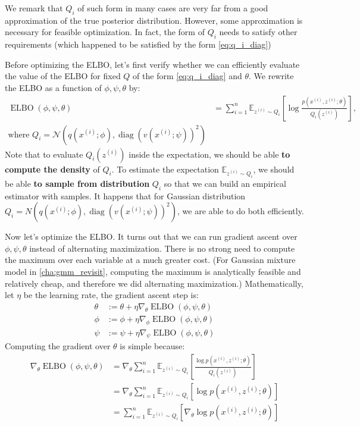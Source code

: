 We remark that $Q_i$ of such form in many cases are very far from a good
approximation of the true posterior distribution. However, some
approximation is necessary for feasible optimization. In fact, the form of $Q_i$ needs to
satisfy other requirements (which happened to be satisfied by the form \ref{eq:q_i_diag})

Before optimizing the ELBO, let's first verify whether we can efficiently
evaluate the value of the ELBO for fixed $Q$ of the form \ref{eq:q_i_diag} and $\theta$. We
rewrite the ELBO as a function of $\phi,\psi,\theta$ by:
\begin{align}
    \operatorname{ELBO}(\phi,\psi,\theta) &= \sum_{i=1}^n \mathbb E_{z^{(i)} \sim Q_i}\left[\log \frac{p(x^{(i)} ,z^{(i)} ;\theta)}{Q_i (z^{(i)})} \right],\label{eq:elbo_phi_psi_theta}\\
    \text{where } Q_i = \mathcal N(q(x^{(i)} ;\phi),\operatorname{diag}(v(x^{(i)} ;\psi))^2)
\end{align}
Note that to evaluate $Q_i(z^{(i)})$ inside the expectation, we should be able \textbf{to
compute the density} of $Q_i$. To estimate the expectation $\mathbb E_{z^{(i)} \sim Q_i}$, we
should be able \textbf{to sample from distribution} $Q_i$ so that we can build an
empirical estimator with samples. It happens that for Gaussian distribution
$Q_i = N(q(x^{(i)} ;\phi),\operatorname{diag}(v(x^{(i)} ;\psi))^2)$, we are able to do both efficiently. %

Now let's optimize the ELBO. It turns out that we can run gradient
ascent over $\phi,\psi,\theta$ instead of alternating maximization. There is no strong
need to compute the maximum over each variable at a much greater cost. (For
Gaussian mixture model in \cref{cha:gmm_revisit}, computing the maximum is analytically
feasible and relatively cheap, and therefore we did alternating maximization.)
Mathematically, let $\eta$ be the learning rate, the gradient ascent step is:
\begin{align*}
    \theta &:= \theta + \eta\nabla_\theta \operatorname{ELBO}(\phi,\psi,\theta)\\
    \phi &:= \phi + \eta\nabla_\phi \operatorname{ELBO}(\phi,\psi,\theta)\\
    \psi &:= \psi + \eta\nabla_\psi \operatorname{ELBO}(\phi,\psi,\theta)
\end{align*}
Computing the gradient over $\theta$ is simple because:
\begin{align}
\nabla_\theta \operatorname{ELBO}(\phi,\psi,\theta) &= \nabla_\theta \sum_{i=1}^n \mathbb E_{z^{(i)} \sim Q_i} \left[ \frac{\log p(x^{(i)} ,z^{(i)} ;\theta)}{Q_i(z^{(i)})}\right]\\
    &= \nabla_\theta \sum_{i=1}^n \mathbb E_{z^{(i)} \sim Q_i} \left[ \log p(x^{(i)} ,z^{(i)} ;\theta) \right]\\
    &= \sum_{i=1}^n \mathbb E_{z^{(i)} \sim Q_i} \left[ \nabla_\theta \log p(x^{(i)} ,z^{(i)} ;\theta) \right]
\end{align}

